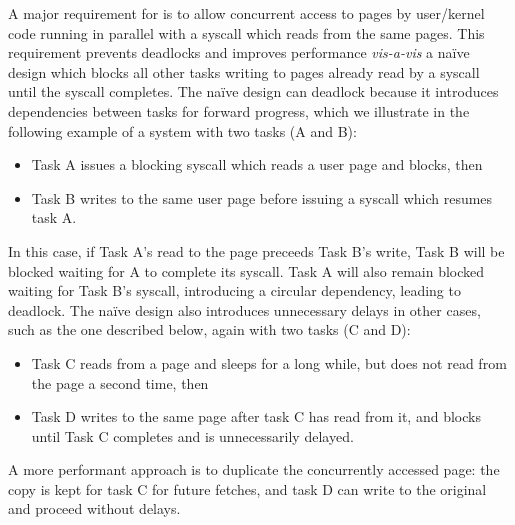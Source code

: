 A major requirement for \midas is to allow concurrent access to pages
by user/kernel code running in parallel with a syscall which reads from
the same pages.
This requirement prevents deadlocks and improves performance \textit{vis-a-vis}
a na\"ive design which blocks all other tasks writing to pages already
read by a syscall until the syscall completes.
The na\"ive design can deadlock because it introduces dependencies between
tasks for forward progress, which we illustrate in the following example
of a system with two tasks (A and B):
\begin{itemize}
  \item Task A issues a blocking syscall which reads a user page and blocks, then
  \item Task B writes to the same user page before issuing a syscall which
  resumes task A.
\end{itemize}
In this case, if Task A's read to the page preceeds Task B's write,
Task B will be blocked waiting for A to complete its syscall.
Task A will also remain blocked waiting for Task B's syscall,
introducing a circular dependency, leading to deadlock.
The na\"ive design also introduces unnecessary delays in other cases,
such as the one described below, again with two tasks (C and D):
\begin{itemize}
  \item Task C reads from a page and sleeps for a long while,
        but does not read from the page a second time, then
  \item Task D writes to the same page after task C has read from it,
        and blocks until Task C completes and is unnecessarily delayed.
\end{itemize}
A more performant approach is to duplicate the concurrently accessed page:
the copy is kept for task C for future fetches, and task D
can write to the original and proceed without delays.

